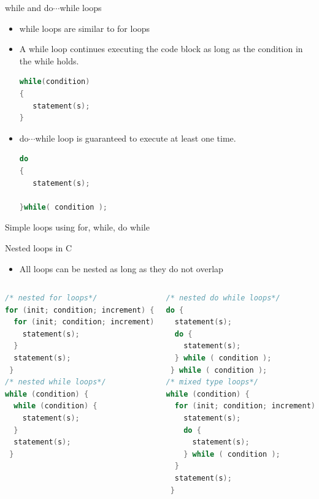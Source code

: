 \documentclass[10pt,t]{beamer}
\begin{document}
\begin{frame}[fragile]{while and do$\cdots$while loops}
  \begin{itemize}
    \item while loops are similar to for loops
    \item A while loop continues executing the code block as long as the condition in the while holds.
      \begin{lstlisting}[language=C,basicstyle=\scriptsize\ttfamily]
while(condition)
{
   statement(s);
}
      \end{lstlisting}
    \item do$\cdots$while loop is guaranteed to execute at least one time.
      \begin{lstlisting}[language=C,basicstyle=\scriptsize\ttfamily]
do
{
   statement(s);

}while( condition );
      \end{lstlisting}
  \end{itemize}
\end{frame}

\begin{frame}[fragile]{Simple loops using for, while, do while}
  
\end{frame}

\begin{frame}[fragile]{Nested loops in C}
  \begin{itemize}
    \item All loops can be nested as long as they do not overlap
  \end{itemize}
  \begin{columns}
    \begin{lstlisting}[language=C,basicstyle=\scriptsize\ttfamily]
/* nested for loops*/
for (init; condition; increment) {
  for (init; condition; increment) {
    statement(s);
  }
  statement(s);
 }
/* nested while loops*/
while (condition) {
  while (condition) {
    statement(s);
  }
  statement(s);
 }
    \end{lstlisting}
    \begin{lstlisting}[language=C,basicstyle=\scriptsize\ttfamily]
/* nested do while loops*/
do {
  statement(s);
  do {
    statement(s);
  } while ( condition );
 } while ( condition );
/* mixed type loops*/
while (condition) {
  for (init; condition; increment) {
    statement(s);
    do {
      statement(s);
    } while ( condition );
  }
  statement(s);
 }
    \end{lstlisting}
  \end{columns}
\end{frame}
\end{document}
